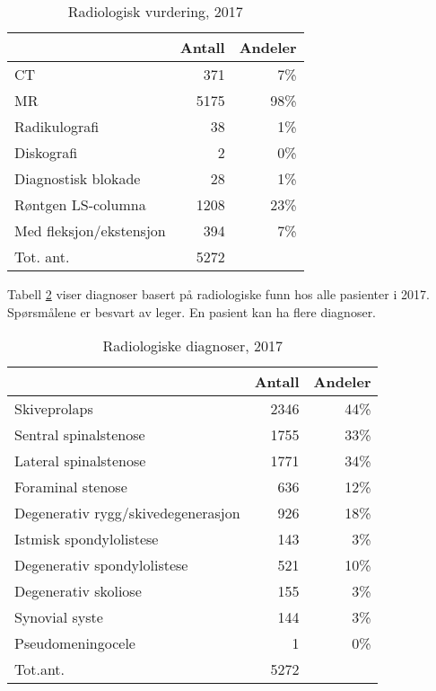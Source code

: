 \documentclass [norsk,a4paper,twoside]{article}\usepackage[]{graphicx}\usepackage[]{color}
\begin{document}
\begin{table}[ht]
\centering
\begin{tabular}{lrr}
  \hline
 & Antall & Andeler \\ 
  \hline
CT & 371 & 7\% \\ 
  MR & 5175 & 98\% \\ 
  Radikulografi & 38 & 1\% \\ 
  Diskografi & 2 & 0\% \\ 
  Diagnostisk blokade & 28 & 1\% \\ 
  Røntgen LS-columna & 1208 & 23\% \\ 
  Med fleksjon/ekstensjon & 394 & 7\% \\ 
  Tot. ant. & 5272 &   \\ 
   \hline
\end{tabular}
\caption{Radiologisk vurdering, 2017} 
\label{tab:RV}
\end{table}




Tabell \ref{tab:RF} viser diagnoser basert på radiologiske funn hos alle pasienter 
i 2017. 
Spørsmålene er besvart av leger.
En pasient kan ha flere diagnoser.


\begin{table}[ht]
\centering
\begin{tabular}{lrr}
  \hline
 & Antall & Andeler \\ 
  \hline
Skiveprolaps & 2346 & 44\% \\ 
  Sentral spinalstenose & 1755 & 33\% \\ 
  Lateral spinalstenose & 1771 & 34\% \\ 
  Foraminal stenose & 636 & 12\% \\ 
  Degenerativ rygg/skivedegenerasjon & 926 & 18\% \\ 
  Istmisk spondylolistese & 143 & 3\% \\ 
  Degenerativ spondylolistese & 521 & 10\% \\ 
  Degenerativ skoliose & 155 & 3\% \\ 
  Synovial syste & 144 & 3\% \\ 
  Pseudomeningocele & 1 & 0\% \\ 
  Tot.ant. & 5272 &   \\ 
   \hline
\end{tabular}
\caption{Radiologiske diagnoser, 2017} 
\label{tab:RF}
\end{table}
\end{document}

